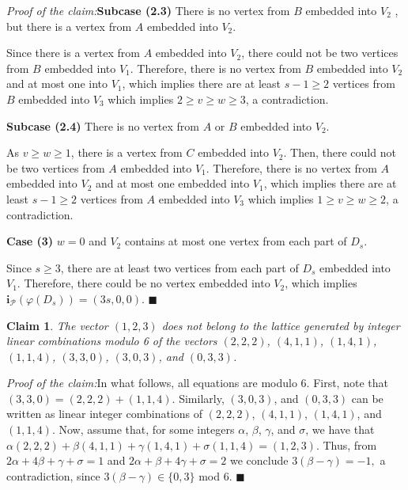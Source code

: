 \documentclass[11pt]{amsart}
\newtheorem{claim}[theorem]{Claim}
\newcommand{\CP}{\mathcal{P}}
\newenvironment{claimproof}[1]{\par\noindent\textit{Proof of the claim:}\space#1}{\leavevmode\unskip\penalty9999 \hbox{}\nobreak\hfill\quad\hbox{$\blacksquare$}}
\begin{document}
\begin{claimproof}
    \medskip \textbf{Subcase (2.3) } There is no vertex from $B$ embedded into $V_2$ , but there is a vertex from $A$ embedded into $V_2$. \medskip
 
    Since there is a vertex from $A$ embedded into $V_2$, there could not be two vertices from $B$ embedded into $V_1$. Therefore, there is no vertex from $B$ embedded into $V_2$ and at most one into $V_1$, which implies there are at least $s-1\ge 2$ vertices from $B$ embedded into $V_3$ which implies $2 \ge v \ge w \ge 3$, a contradiction.

    \medskip \textbf{Subcase (2.4) } There is no vertex from $A$ or $B$ embedded into $V_2$. \medskip
    
    As $v\ge w\ge 1$, there is a vertex from $C$ embedded into $V_2$. Then, there could not be two vertices from $A$ embedded into $V_1$. Therefore, there is no vertex from $A$ embedded into $V_2$ and at most one embedded into $V_1$, which implies there are at least $s-1\ge 2$ vertices from $A$ embedded into $V_3$ which implies $1 \ge v \ge w \ge 2$, a contradiction.

    \medskip \noindent  \textbf{Case (3) } $w=0$ and $V_2$ contains at most one vertex from each part of $D_s$. \medskip
    
    Since $s\ge 3$, there are at least two vertices from each part of $D_s$ embedded into $V_1$. Therefore, there could be no vertex embedded into $V_2$, which implies $\mathbf{i}_\CP(\varphi(D_s))=(3s,0,0)$.
\end{claimproof}

\begin{claim} \label{claim:lin_comb}
    The vector $(1,2,3)$ does not belong to the lattice generated by integer linear combinations modulo 6 of the vectors $(2,2,2)$, $(4,1,1)$, $(1,4,1)$, $(1,1,4)$, $(3,3,0)$, $(3,0,3)$, and $(0,3,3)$.
\end{claim}

\begin{claimproof}
    In what follows, all equations are modulo 6. First, note that 
    $(3,3,0) = (2,2,2)+(1,1,4).$ 
    Similarly, $(3,0,3)$, and $(0,3,3)$ can be written as linear integer combinations of $(2,2,2)$, $(4,1,1)$, $(1,4,1)$, and $(1,1,4)$.
    Now, assume that, for some integers $\alpha$, $\beta$, $\gamma$, and $\sigma$, we have that 
    $\alpha (2,2,2)+ \beta (4,1,1) + \gamma (1,4,1) + \sigma (1,1,4) = (1,2,3).$
    Thus, from
    $ 2 \alpha + 4 \beta + \gamma + \sigma = 1$ and
    $ 2 \alpha + \beta + 4 \gamma + \sigma = 2$
    we conclude
    $ 3 (\beta - \gamma) = -1, $
    a contradiction, since $3 (\beta - \gamma) \in \{0,3\}$ mod 6.
\end{claimproof}
\end{document}
